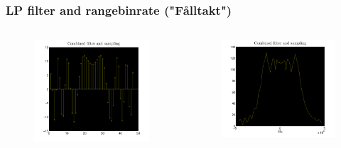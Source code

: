 \documentclass[11pt]{beamer} %
\begin{document}
\begin{frame}
 \frametitle{LP filter and rangebinrate ("Fålltakt")}
 \begin{columns}[T]
        \begin{column}{.5\textwidth}
           
      \begin{figure}
\includegraphics[width=1\textwidth]{Figures/SampledTxCombinedFilterSamp.pdf}
\end{figure}
        \end{column}
         \begin{column}{.5\textwidth}

   \begin{figure}
\includegraphics[width=1\textwidth]{Figures/SampledTxCombinedFilterSampFft.pdf}
\end{figure}
        \end{column}
\end{columns}
\end{frame}
\end{document}
